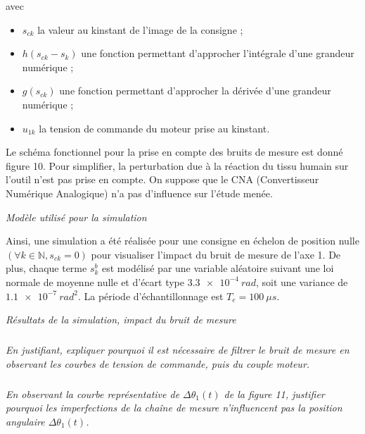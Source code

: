avec
\begin{itemize}
\item $s_{ck}$ la valeur au k\ieme instant de l’image de la consigne ;
\item $h\left(s_{ck}-s_k \right)$ une fonction permettant d’approcher l’intégrale d’une grandeur numérique ;
\item $g\left(s_{ck}\right)$ une fonction permettant d’approcher la dérivée d’une grandeur numérique ;
\item $u_{1k}$ la tension de commande du moteur prise au k\ieme instant.
\end{itemize}
Le schéma fonctionnel pour la prise en compte des bruits de mesure est donné figure 10. Pour simplifier, la
perturbation due à la réaction du tissu humain sur l’outil n’est pas prise en compte. On suppose que le CNA
(Convertisseur Numérique Analogique) n’a pas d’influence sur l’étude menée.

\begin{center}


\textit{Modèle utilisé pour la simulation}
\end{center}


Ainsi, une simulation a été réalisée pour une consigne en échelon de position nulle $(\forall k \in \mathbb{N}, s_{ck}=0)$
pour visualiser l’impact du bruit de mesure de l’axe 1. De plus, chaque terme $s_k^b$
est modélisé par une variable aléatoire suivant une loi normale de moyenne nulle et d’écart type $\SI{3,3e-4}{rad}$, soit une variance de $\SI{1,1e-7}{rad^2}$. La période d’échantillonnage est $T_e = \SI{100}{\mu s}$.


\begin{center}


\textit{Résultats de la simulation, impact du bruit de mesure}
\end{center}



\subparagraph{}
\textit{En justifiant, expliquer pourquoi il est nécessaire de filtrer le bruit de mesure en observant les courbes
de tension de commande, puis du couple moteur.}
\ifprof
\begin{corrige}
\end{corrige}
\else
\fi


\subparagraph{}
\textit{En observant la courbe représentative de $\Delta\theta_1(t)$ de la figure 11, justifier pourquoi les imperfections de
la chaîne de mesure n’influencent pas la position angulaire $\Delta\theta_1(t)$.}
\ifprof
\begin{corrige}
\end{corrige}
\else
\fi


